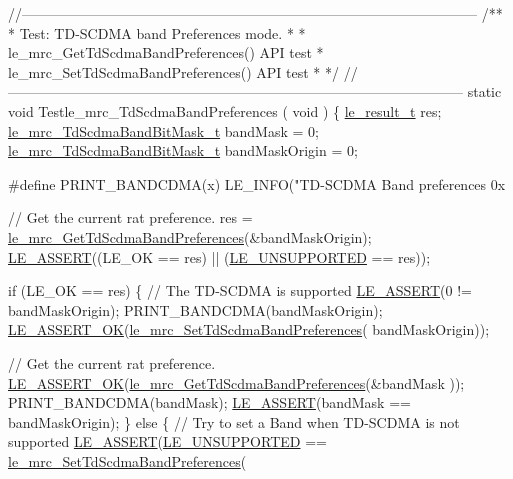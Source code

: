 \begin{DoxyCodeInclude}
{{\textcolor{comment}{//--------------------------------------------------------------------------------------------------}\textcolor{comment}{}
\textcolor{comment}{/**}
\textcolor{comment}{ * Test: TD-SCDMA band Preferences mode.}
\textcolor{comment}{ *}
\textcolor{comment}{ * le\_mrc\_GetTdScdmaBandPreferences() API test}
\textcolor{comment}{ * le\_mrc\_SetTdScdmaBandPreferences() API test}
\textcolor{comment}{ *}
\textcolor{comment}{ */}
\textcolor{comment}{//--------------------------------------------------------------------------------------------------}
\textcolor{keyword}{static} \textcolor{keywordtype}{void} Testle\_mrc\_TdScdmaBandPreferences
(
    \textcolor{keywordtype}{void}
)
\{
    \hyperlink{le__basics_8h_a1cca095ed6ebab24b57a636382a6c86c}{le\_result\_t} res;
    \hyperlink{le__mrc__interface_8h_a418a508a9a6dbd3a4a68458f0c64a00e}{le\_mrc\_TdScdmaBandBitMask\_t} bandMask = 0;
    \hyperlink{le__mrc__interface_8h_a418a508a9a6dbd3a4a68458f0c64a00e}{le\_mrc\_TdScdmaBandBitMask\_t} bandMaskOrigin = 0;

\textcolor{preprocessor}{#define  PRINT\_BANDCDMA(x)   LE\_INFO("TD-SCDMA Band preferences 0x%

    \textcolor{comment}{// Get the current rat preference.}
    res = \hyperlink{le__mrc__interface_8h_aed41544004ed7df9de8e874b8bb09d3b}{le\_mrc\_GetTdScdmaBandPreferences}(&bandMaskOrigin);
    \hyperlink{le__log_8h_ac0dbbef91dc0fed449d0092ff0557b39}{LE\_ASSERT}((LE\_OK == res) || (\hyperlink{le__basics_8h_a1cca095ed6ebab24b57a636382a6c86ca5377262702e8434207b03533259e0c5f}{LE\_UNSUPPORTED} == res));

    \textcolor{keywordflow}{if} (LE\_OK == res)
    \{
        \textcolor{comment}{// The TD-SCDMA is supported}
        \hyperlink{le__log_8h_ac0dbbef91dc0fed449d0092ff0557b39}{LE\_ASSERT}(0 != bandMaskOrigin);
        PRINT\_BANDCDMA(bandMaskOrigin);
        \hyperlink{le__log_8h_a7cd2daa3d4af1de4d29e0eed95187484}{LE\_ASSERT\_OK}(\hyperlink{le__mrc__interface_8h_a8765511597189b64e486fa8f17bcddcd}{le\_mrc\_SetTdScdmaBandPreferences}(
      bandMaskOrigin));

        \textcolor{comment}{// Get the current rat preference.}
        \hyperlink{le__log_8h_a7cd2daa3d4af1de4d29e0eed95187484}{LE\_ASSERT\_OK}(\hyperlink{le__mrc__interface_8h_aed41544004ed7df9de8e874b8bb09d3b}{le\_mrc\_GetTdScdmaBandPreferences}(&bandMask
      ));
        PRINT\_BANDCDMA(bandMask);
        \hyperlink{le__log_8h_ac0dbbef91dc0fed449d0092ff0557b39}{LE\_ASSERT}(bandMask == bandMaskOrigin);
    \}
    \textcolor{keywordflow}{else}
    \{
        \textcolor{comment}{// Try to set a Band when TD-SCDMA is not supported}
        \hyperlink{le__log_8h_ac0dbbef91dc0fed449d0092ff0557b39}{LE\_ASSERT}(\hyperlink{le__basics_8h_a1cca095ed6ebab24b57a636382a6c86ca5377262702e8434207b03533259e0c5f}{LE\_UNSUPPORTED} == 
      \hyperlink{le__mrc__interface_8h_a8765511597189b64e486fa8f17bcddcd}{le\_mrc\_SetTdScdmaBandPreferences}(
                                                       
}}}
\end{DoxyCodeInclude}
